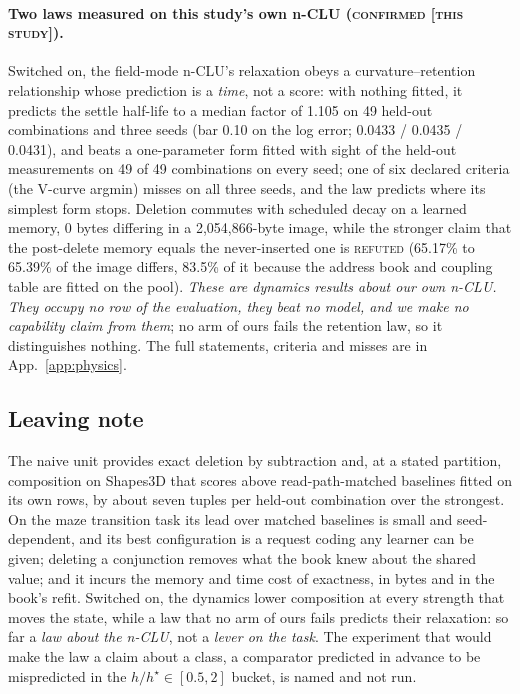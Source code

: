 \documentclass{article} %
\begin{document}
\paragraph{Two laws measured on this study's own n-CLU (\textsc{confirmed [this study]}).}
Switched on, the field-mode n-CLU's relaxation obeys a curvature--retention relationship whose
prediction is a \emph{time}, not a score: with nothing fitted, it predicts the settle half-life to
a median factor of 1.105 on 49 held-out combinations and three seeds (bar 0.10 on the log error; 0.0433
/ 0.0435 / 0.0431), and beats a one-parameter form fitted with sight of the held-out measurements
on 49 of 49 combinations on every seed; one of six declared criteria (the V-curve argmin) misses on
all three seeds, and the law predicts where its simplest form stops.
Deletion commutes with scheduled decay on a learned memory, 0 bytes differing in a 2,054,866-byte
image, while the stronger claim that the post-delete memory equals the never-inserted one is
\textsc{refuted} (65.17\% to 65.39\% of the image differs, 83.5\% of it because the address book
and coupling table are fitted on the pool). %
\emph{These are dynamics results about our own n-CLU. They occupy no row of the evaluation, they
beat no model, and we make no capability claim from them}; no arm of ours fails the retention law,
so it distinguishes nothing. The full statements, criteria and misses are in
App.~\ref{app:physics}.

\subsection{Leaving note}
\label{sec:leaving}

The naive unit provides exact deletion by subtraction and, at a stated partition, composition on
Shapes3D that scores above read-path-matched baselines fitted on its own rows, by about seven tuples per
held-out combination over the strongest. On the maze transition task its lead over matched
baselines is small and seed-dependent, and its best configuration is a request coding any learner can be
given; deleting a conjunction removes what the book knew about the shared value; and it incurs the
memory and time cost of exactness, in bytes and in the book's refit. Switched on, the dynamics lower composition at
every strength that moves the state, while a law that no arm of ours fails predicts their relaxation:
so far a \emph{law about the n-CLU}, not a \emph{lever on the task}. The experiment that would make
the law a claim about a class, a comparator predicted in advance to be mispredicted in the
$h/h^\star\in[0.5,2]$ bucket, is named and not run. %
\end{document}
